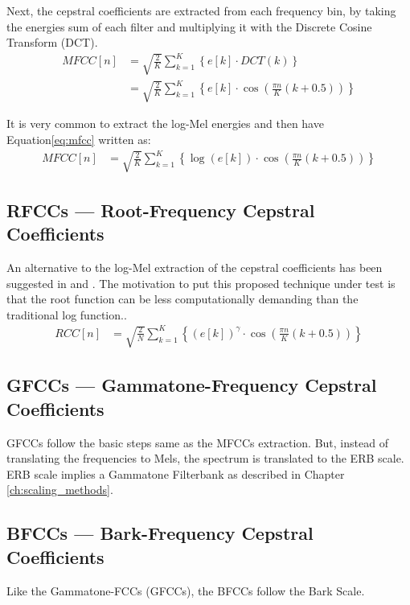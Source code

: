Next, the cepstral coefficients are extracted from each frequency bin, 
by taking the energies sum of each filter and multiplying it
with the Discrete Cosine Transform (DCT).
\begin{align}\label{eq:mfcc}
    MFCC[n] & = \sqrt{\frac{2}{K}} \sum_{k=1}^{K} \left\{ 
        e[k] \cdot DCT\left( k \right)
     \right\} \nonumber \\
     & = \sqrt{\frac{2}{K}} \sum_{k=1}^{K} \left\{ 
        e[k] \cdot \cos \left( \frac{\pi n}{K} (k+0.5) \right)
     \right\}
\end{align}

It is very common to extract the log-Mel energies
and then have Equation\;\ref{eq:mfcc} written as:
\begin{align}\label{eq:logmfcc}
    MFCC[n] & = \sqrt{\frac{2}{K}} \sum_{k=1}^{K} \left\{ 
        \log \left( e[k] \right) \cdot \cos \left( \frac{\pi n}{K} (k+0.5) \right)
     \right\}
\end{align}


\subsection{RFCCs --- Root-Frequency Cepstral Coefficients}
An alternative to the log-Mel 
extraction of the cepstral coefficients
has been suggested in \cite{rmfcc1} and \cite{1415167}.
The motivation to put this proposed 
technique under test is that the root 
function can be less computationally demanding 
than the traditional log function..
\begin{align}
    RCC[n] & = \sqrt{\frac{2}{N}} \sum_{k=1}^{K} \left\{ 
        \left( e[k] \right)^{\gamma} \cdot \cos \left( \frac{\pi n}{K} (k+0.5) \right)
     \right\}
\end{align}

\subsection{GFCCs --- Gammatone-Frequency Cepstral Coefficients}
GFCCs follow the basic steps same as the MFCCs extraction.
But, instead of translating the frequencies to Mels,
the spectrum is translated to the ERB scale.
ERB scale implies a Gammatone Filterbank as described in Chapter \ref{ch:scaling_methods}.


\subsection{BFCCs --- Bark-Frequency Cepstral Coefficients}
Like the Gammatone-FCCs (GFCCs), the BFCCs follow the Bark Scale.

